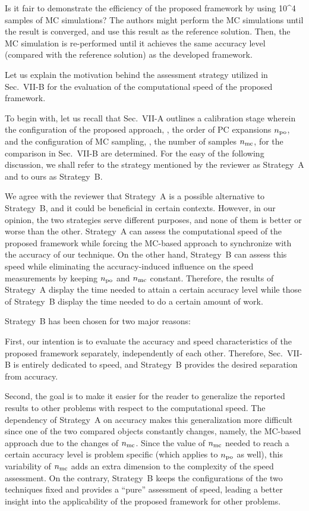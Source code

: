 \begin{reviewer}
Is it fair to demonstrate the efficiency of the proposed framework by using 10\^{}4 samples of MC simulations? The authors might perform the MC simulations until the result is converged, and use this result as the reference solution. Then, the MC simulation is re-performed until it achieves the same accuracy level (compared with the reference solution) as the developed framework.
\end{reviewer}
\begin{authors}
Let us explain the motivation behind the assessment strategy utilized in Sec.~VII-B for the evaluation of the computational speed of the proposed framework.

To begin with, let us recall that Sec.~VII-A outlines a calibration stage wherein the configuration of the proposed approach, \ie, the order of PC expansions ${n_\text{po}}$, and the configuration of MC sampling, \ie, the number of samples ${n_\text{mc}}$, for the comparison in Sec.~VII-B are determined.
For the easy of the following discussion, we shall refer to the strategy mentioned by the reviewer as Strategy~A and to ours as Strategy~B.

We agree with the reviewer that Strategy~A is a possible alternative to Strategy~B, and it could be beneficial in certain contexts.
However, in our opinion, the two strategies serve different purposes, and none of them is better or worse than the other.
Strategy~A can assess the computational speed of the proposed framework while forcing the MC-based approach to synchronize with the accuracy of our technique.
On the other hand, Strategy~B can assess this speed while eliminating the accuracy-induced influence on the speed measurements by keeping ${n_\text{po}}$ and ${n_\text{mc}}$ constant.
Therefore, the results of Strategy~A display the time needed to attain a certain accuracy level while those of Strategy~B display the time needed to do a certain amount of work.

Strategy~B has been chosen for two major reasons:

First, our intention is to evaluate the accuracy and speed characteristics of the proposed framework separately, independently of each other.
Therefore, Sec.~VII-B is entirely dedicated to speed, and Strategy~B provides the desired separation from accuracy.

Second, the goal is to make it easier for the reader to generalize the reported results to other problems with respect to the computational speed.
The dependency of Strategy~A on accuracy makes this generalization more difficult since one of the two compared objects constantly changes, namely, the MC-based approach due to the changes of ${n_\text{mc}}$.
Since the value of ${n_\text{mc}}$ needed to reach a certain accuracy level is problem specific (which applies to ${n_\text{po}}$ as well), this variability of ${n_\text{mc}}$ adds an extra dimension to the complexity of the speed assessment.
On the contrary, Strategy~B keeps the configurations of the two techniques fixed and provides a ``pure'' assessment of speed, leading a better insight into the applicability of the proposed framework for other problems.


\end{authors}
